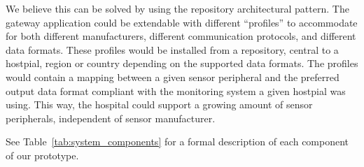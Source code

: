 We believe this can be solved by using the repository architectural pattern. The gateway application could be extendable with different ``profiles'' to accommodate for both different manufacturers,  different communication protocols, and different data formats. These profiles would be installed from a repository, central to a hostpial, region or country depending on the supported data formats. The profiles would contain a mapping between a given sensor peripheral and the preferred output data format compliant with the monitoring system a given hostpial was using. This way, the hospital could support a growing amount of sensor peripherals, independent of sensor manufacturer.

See Table~\ref{tab:system_components} for a formal description of each component of our prototype.


